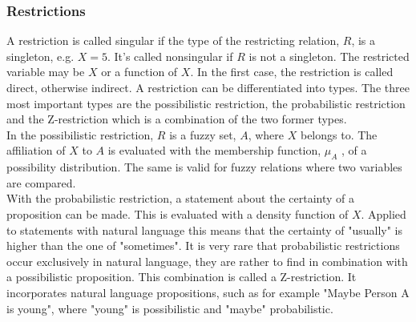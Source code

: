 \documentclass[conference]{IEEEtran}
\begin{document}
\subsubsection{Restrictions}
A restriction is called singular if the type of the restricting relation, \begin{math} R \end{math}, is a singleton, e.g. \begin{math} X=5 \end{math}. It’s called nonsingular if \begin{math} R \end{math} is not a singleton. The restricted variable may be \begin{math} X \end{math} or a function of \begin{math} X \end{math}. In the first case, the restriction is called direct, otherwise indirect. A restriction can be differentiated into types. The three most important types are the possibilistic restriction, the probabilistic restriction and the Z-restriction which is a combination of the two former types.\\
In the possibilistic restriction, \begin{math} R \end{math} is a fuzzy set, \begin{math} A \end{math}, where \begin{math} X \end{math} belongs to. The affiliation of \begin{math} X \end{math} to \begin{math} A \end{math} is evaluated with the membership function, \begin{math} \mu_{A} \end{math} , of a possibility distribution. The same is valid for fuzzy relations where two variables are compared.\\
With the probabilistic restriction, a statement about the certainty of a proposition can be made. This is evaluated with a density function of \begin{math} X \end{math}. Applied to statements with natural language this means that the certainty of "usually" is higher than the one of "sometimes". It is very rare that probabilistic restrictions occur exclusively in natural language, they are rather to find in combination with a possibilistic proposition. This combination is called a Z-restriction. It incorporates natural language propositions, such as for example "Maybe Person A is young", where "young" is possibilistic and "maybe" probabilistic.\\
\end{document}
